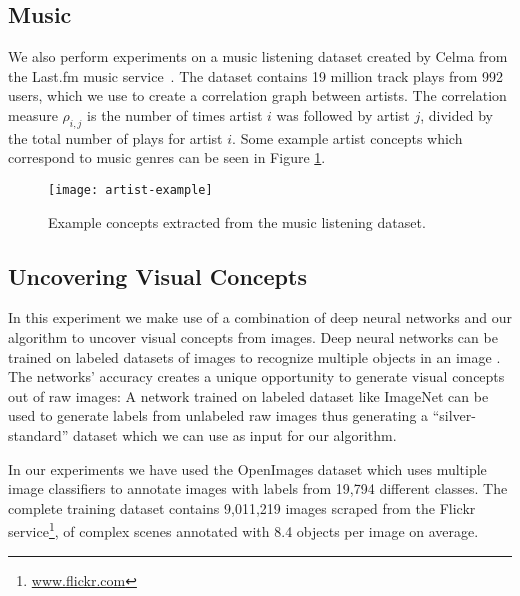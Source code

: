 \subsection{Music}

We also perform experiments on a music listening dataset created by Celma from
the Last.fm music service~\cite{celma-long-tail}. The dataset contains 19 million
track plays from 992 users, which we use to create a correlation graph between
artists. The correlation measure $\rho_{i, j}$ is the number of times artist $i$ was followed
by artist $j$, divided by the total number of plays for artist $i$. Some example
artist concepts which correspond to music genres can be seen in Figure
\ref{fig:concepts-artists}.

\begin{figure}
	\centering
	\texttt{[image: artist-example]}
	\caption{Example concepts extracted from the music listening dataset.}
	\label{fig:concepts-artists}
\end{figure}

\subsection{Uncovering Visual Concepts}

\label{sec:concepts-openimages}

In this experiment we make use of a combination of deep neural networks and our
algorithm to uncover visual concepts from images. Deep neural networks
can be trained on labeled datasets of images to recognize multiple objects
in an image \cite{deep-learning}. The networks' accuracy creates a unique opportunity
to generate visual concepts out of raw images: A network trained on labeled dataset
like ImageNet \cite{imagenet} can be used to generate labels from unlabeled raw images thus generating
a ``silver-standard'' dataset which we can use as input for our algorithm.

In our experiments we have used the OpenImages dataset \cite{openimages} which uses
multiple image classifiers to annotate images with labels from 19,794 different
classes. The complete training
dataset contains 9,011,219 images scraped from the Flickr service\footnote{\url{www.flickr.com}}, of complex scenes annotated with 8.4 objects per image on average.

